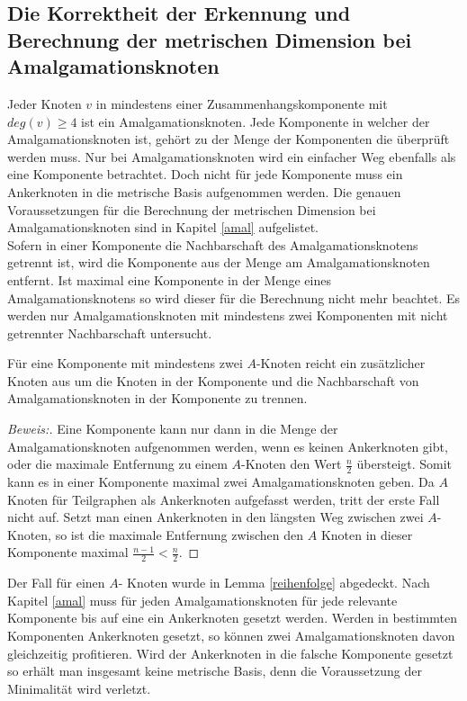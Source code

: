 \subsection{Die Korrektheit der Erkennung und Berechnung der metrischen Dimension bei Amalgamationsknoten}
\label{korramal}
Jeder Knoten $v$ in mindestens einer Zusammenhangskomponente mit $deg(v)\geq 4$ ist ein Amalgamationsknoten. Jede Komponente in welcher der Amalgamationsknoten ist, gehört zu der Menge der Komponenten die überprüft werden muss. Nur bei Amalgamationsknoten wird ein einfacher Weg ebenfalls als eine Komponente betrachtet. Doch nicht für jede Komponente muss ein Ankerknoten in die metrische Basis aufgenommen werden.
Die genauen Voraussetzungen für die Berechnung der metrischen Dimension bei Amalgamationsknoten sind in Kapitel \ref{amal} aufgelistet.\\Sofern in einer Komponente die Nachbarschaft des Amalgamationsknotens getrennt ist, wird die Komponente aus der Menge am Amalgamationsknoten entfernt. Ist maximal eine Komponente in der Menge eines Amalgamationsknotens so wird dieser für die Berechnung nicht mehr beachtet. Es werden nur Amalgamationsknoten mit mindestens zwei Komponenten mit nicht getrennter Nachbarschaft untersucht.
\begin{lem}
Für eine Komponente mit mindestens zwei $A$-Knoten reicht ein zusätzlicher Knoten aus um die Knoten in der Komponente und die Nachbarschaft von Amalgamationsknoten in der Komponente zu trennen.
\end{lem}
\vspace{-4mm}
\begin{proof}[Beweis:]
Eine Komponente kann nur dann in die Menge der Amalgamationsknoten aufgenommen werden, wenn es keinen Ankerknoten gibt, oder die maximale Entfernung zu einem $A$-Knoten den Wert $\frac{n}{2}$ übersteigt. Somit kann es in einer Komponente maximal zwei Amalgamationsknoten geben. Da $A$ Knoten für Teilgraphen als Ankerknoten aufgefasst werden, tritt der erste Fall nicht auf. Setzt man einen Ankerknoten in den längsten Weg zwischen zwei $A$-Knoten, so ist die maximale Entfernung zwischen den $A$ Knoten in dieser Komponente maximal $\frac{n-1}{2} < \frac{n}{2}$.
\end{proof}
\vspace{-3mm}
Der Fall für einen $A$- Knoten wurde in Lemma \ref{reihenfolge} abgedeckt. Nach Kapitel \ref{amal} muss für jeden Amalgamationsknoten für jede relevante Komponente bis auf eine ein Ankerknoten gesetzt werden. Werden in bestimmten Komponenten Ankerknoten gesetzt, so können zwei Amalgamationsknoten davon gleichzeitig profitieren. Wird der Ankerknoten in die falsche Komponente gesetzt so erhält man insgesamt keine metrische Basis, denn die Voraussetzung der Minimalität wird verletzt.\newline
